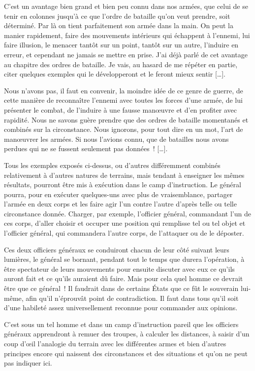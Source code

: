 \documentclass[french,twoside]{book} %
\begin{document}
C’est un avantage bien grand et bien peu connu dans nos armées, que celui de se tenir en colonnes jusqu’à ce que l’ordre de bataille qu’on veut prendre, soit déterminé. Par là on tient parfaitement son armée dans la main. On peut la manier rapidement, faire des mouvements intérieurs qui échappent à l’ennemi, lui faire illusion, le menacer tantôt sur un point, tantôt sur un autre, l’induire en erreur, et cependant ne jamais se mettre en prise. J’ai déjà parlé de cet avantage au chapitre des ordres de bataille. Je vais, au hasard de me répéter en partie, citer quelques exemples qui le développeront et le feront mieux sentir […].\par
Nous n’avons pas, il faut en convenir, la moindre idée de ce genre de guerre, de cette manière de reconnaître l’ennemi avec toutes les forces d’une armée, de lui présenter le combat, de l’induire à une fausse manœuvre et d’en profiter avec rapidité. Nous ne savons guère prendre que des ordres de bataille momentanés et combinés sur la circonstance. Nous ignorons, pour tout dire en un mot, l’art de manœuvrer les armées. Si nous l’avions connu, que de batailles nous avons perdues qui ne se fussent seulement pas données ! […].\par
Tous les exemples exposés ci-dessus, ou d’autres différemment combinés relativement à d’autres natures de terrains, mais tendant à enseigner les mêmes résultats, pourront être mis à exécution dans le camp d’instruction. Le général pourra, pour en exécuter quelques-uns avec plus de vraisemblance, partager l’armée en deux corps et les faire agir l’un contre l’autre d’après telle ou telle circonstance donnée. Charger, par exemple, l’officier général, commandant l’un de ces corps, d’aller choisir et occuper une position qui remplisse tel ou tel objet et l’officier général, qui commandera l’autre corps, de l’attaquer ou de le déposter.\par
Ces deux officiers généraux se conduiront chacun de leur côté suivant leurs lumières, le général se bornant, pendant tout le temps que durera l’opération, à être spectateur de leurs mouvements pour ensuite discuter avec eux ce qu’ils auront fait et ce qu’ils auraient dû faire. Mais pour cela quel homme ce devrait être que ce général ! Il faudrait dans de certains États que ce fût le souverain lui-même, afin qu’il n’éprouvât point de contradiction. Il faut dans tous qu’il soit d’une habileté assez universellement reconnue pour commander aux opinions.\par
C’est sous un tel homme et dans un camp d’instruction pareil que les officiers généraux apprendront à remuer des troupes, à calculer les distances, à saisir d’un coup d’œil l’analogie du terrain avec les différentes armes et bien d’autres principes encore qui naissent des circonstances et des situations et qu’on ne peut pas indiquer ici.\par
\end{document}
